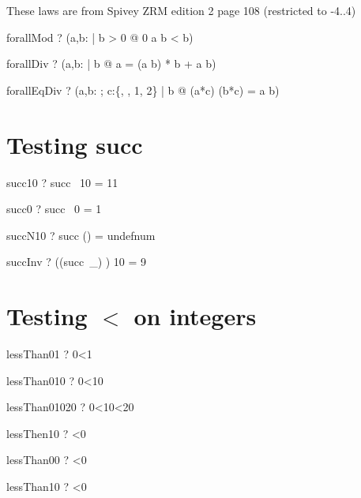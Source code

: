 \documentclass{article}
\begin{document}
 These laws are from Spivey ZRM edition 2 page 108 (restricted to -4..4)
\begin{theorem}{forallMod}   \vdash?   (\forall a,b:  | b > 0 @ 0 \leq a \mod b < b) \end{theorem}
\begin{theorem}{forallDiv}   \vdash?   (\forall a,b:  | b  @ a = (a \div b) * b + a \mod b) \end{theorem}
\begin{theorem}{forallEqDiv} \vdash?   (\forall a,b: ; c:\{, , 1, 2\} | b  @ (a*c) \div (b*c) = a \div b) \end{theorem}

\section{Testing succ}
\begin{theorem}{succ10} \vdash?   succ~ 10 = 11 \end{theorem}
\begin{theorem}{succ0} \vdash?   succ~ 0 = 1 \end{theorem}
\begin{theorem}{succN10} \vdash?   succ () = undefnum \end{theorem}
\begin{theorem}{succInv} \vdash?   ((succ~\_) \inv) 10 = 9 \end{theorem}

\section{Testing $<$ on integers}
\begin{theorem}{lessThan01}  \vdash?   0<1 \end{theorem}
\begin{theorem}{lessThan010} \vdash?   0<10 \end{theorem}
\begin{theorem}{lessThan01020} \vdash?   0<10<20 \end{theorem}
\begin{theorem}{lessThen10}  \vdash?   <0 \end{theorem}
\begin{theorem}{lessThan00}  \vdash?   <0 \end{theorem}
\begin{theorem}{lessThan10}  \vdash?   <0 \end{theorem}
\end{document}
